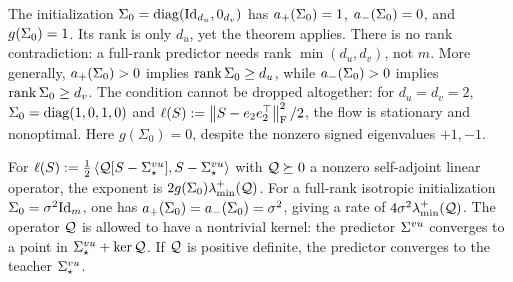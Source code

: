 \begin{remark}\label{rem:singular-support}
The initialization $\Sigma_0=\operatorname{diag}(\mathrm{Id}_{d_u},0_{d_v})$ has
$a_+(\Sigma_0)=1$, $a_-(\Sigma_0)=0$, and $g(\Sigma_0)=1$.
Its rank is only $d_u$, yet the theorem applies. There is no rank
contradiction: a full-rank predictor needs rank $\min(d_u,d_v)$, not $m$.
More generally, $a_+(\Sigma_0)>0$ implies $\operatorname{rank}\Sigma_0\ge d_u$,
while $a_-(\Sigma_0)>0$ implies $\operatorname{rank}\Sigma_0\ge d_v$.
The condition cannot be dropped altogether: for $d_u=d_v=2$,
$\Sigma_0=\operatorname{diag}(1,0,1,0)$ and
$\ell(S):=\left\lVert S-e_2e_2^\top \right\rVert_{\mathrm{F}}^2/2$, the flow is stationary and
nonoptimal. Here $g(\Sigma_0) = 0$, despite the nonzero signed eigenvalues $+1,-1$.
\end{remark}

\begin{remark}
For $\ell(S):=\frac12\left\langle \mathcal Q[S-\Sigma^{vu}_\star],S-\Sigma^{vu}_\star \right\rangle$ with
$\mathcal Q\succeq0$ a nonzero self-adjoint linear operator, the exponent is
$2g(\Sigma_0)\lambda_{\min}^{+}(\mathcal Q)$. For a full-rank isotropic initialization
$\Sigma_0=\sigma^2\mathrm{Id}_m$, one has $a_+(\Sigma_0)=a_-(\Sigma_0)=\sigma^2$,
giving a rate of $4\sigma^2\lambda_{\min}^{+}(\mathcal Q)$.
The operator $\mathcal Q$ is allowed to have a nontrivial kernel: the predictor $\Sigma^{vu}$ converges to a point in
$\Sigma^{vu}_\star+\operatorname{ker}\mathcal Q$. If $\mathcal Q$ is positive definite, the predictor converges to the teacher $\Sigma^{vu}_\star$.
\end{remark}

